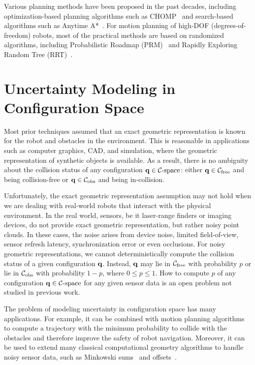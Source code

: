 Various planning methods have been proposed in the past decades, including optimization-based planning algorithms such as CHOMP~\cite{Ratliff:2009} and search-based algorithms such as Anytime A*~\cite{Likhachev05anytimedynamic}. For motion planning of high-DOF (degrees-of-freedom) robots, most of the practical methods are based on randomized algorithms, including Probabilistic Roadmap (PRM)~\cite{Kavraki96} and Rapidly Exploring Random Tree (RRT)~\cite{Kuffner00}.


\section{Uncertainty Modeling in Configuration Space}
\label{sec:1:uncertainty}
Most prior techniques assumed that an exact geometric representation is known for the robot and obstacles in the environment. This is reasonable in applications such as computer graphics, CAD, and simulation, where the geometric representation of synthetic objects is available. As a result, there is no ambiguity about the collision status of any configuration $\mathbf q \in \mathcal C\text{-space}$: either $\mathbf q \in \mathcal C_{\text{free}}$ and being collision-free or $\mathbf q \in \mathcal C_{\text{obs}}$ and being in-collision.

Unfortunately, the exact geometric representation assumption may not hold when we are dealing with real-world robots that interact with the physical environment. In the real world, sensors, be
it laser-range finders or imaging devices, do not provide exact geometric representation, but rather noisy point clouds. In these cases, the noise arises from device noise, limited field-of-view, sensor refresh latency, synchronization error or even occlusions. For noisy geometric representations, we cannot deterministically compute the collision status of a given configuration $\mathbf q$. Instead, $\mathbf q$ may lie in $\mathcal C_{\text{free}}$ with probability $p$ or lie in $\mathcal C_{\text{obs}}$ with probability $1-p$, where $0 \leq p \leq 1$. How to compute $p$ of any configuration $\mathbf q \in \mathcal C\text{-space}$ for any given sensor data is an open problem not studied in previous work.

The problem of modeling uncertainty in configuration space has many applications. For example, it can be combined with motion planning algorithms to compute a trajectory with the minimum probability to collide with the obstacles and therefore improve the safety of robot navigation. Moreover, it can be used to extend many classical computational geometry algorithms to handle noisy sensor data, such as Minkowski sums~\cite{Varadhan:2006:TPA} and offsets~\cite{Choi:1997:CAD}.

